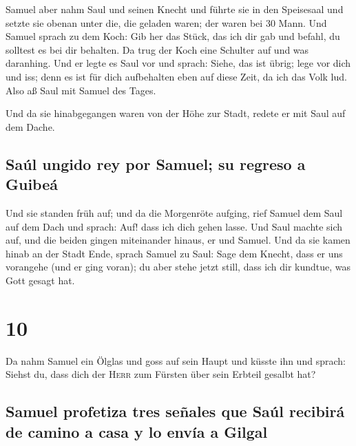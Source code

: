  Samuel aber nahm Saul und seinen Knecht und führte sie
in den Speisesaal und setzte sie obenan unter die, die geladen waren;
der waren bei 30 Mann.  Und Samuel sprach zu dem Koch:
Gib her das Stück, das ich dir gab und befahl, du solltest es bei dir
behalten.  Da trug der Koch eine Schulter auf und was
daranhing. Und er legte es Saul vor und sprach: Siehe, das ist übrig;
lege vor dich und iss; denn es ist für dich aufbehalten eben auf diese
Zeit, da ich das Volk lud. Also aß Saul mit Samuel des Tages.

 Und da sie hinabgegangen waren von der Höhe zur Stadt,
redete er mit Saul auf dem Dache.

\hypertarget{sauxfal-ungido-rey-por-samuel-su-regreso-a-guibeuxe1}{%
\subsection{Saúl ungido rey por Samuel; su regreso a
Guibeá}\label{sauxfal-ungido-rey-por-samuel-su-regreso-a-guibeuxe1}}

 Und sie standen früh auf; und da die Morgenröte aufging,
rief Samuel dem Saul auf dem Dach und sprach: Auf! dass ich dich gehen
lasse. Und Saul machte sich auf, und die beiden gingen miteinander
hinaus, er und Samuel.  Und da sie kamen hinab an der
Stadt Ende, sprach Samuel zu Saul: Sage dem Knecht, dass er uns
vorangehe (und er ging voran); du aber stehe jetzt still, dass ich dir
kundtue, was Gott gesagt hat.

\hypertarget{section-9}{%
\section{10}\label{section-9}}

 Da nahm Samuel ein Ölglas und goss auf sein Haupt und
küsste ihn und sprach: Siehst du, dass dich der \textsc{Herr} zum
Fürsten über sein Erbteil gesalbt hat?

\hypertarget{samuel-profetiza-tres-seuxf1ales-que-sauxfal-recibiruxe1-de-camino-a-casa-y-lo-envuxeda-a-gilgal}{%
\subsection{Samuel profetiza tres señales que Saúl recibirá de camino a
casa y lo envía a
Gilgal}\label{samuel-profetiza-tres-seuxf1ales-que-sauxfal-recibiruxe1-de-camino-a-casa-y-lo-envuxeda-a-gilgal}}

